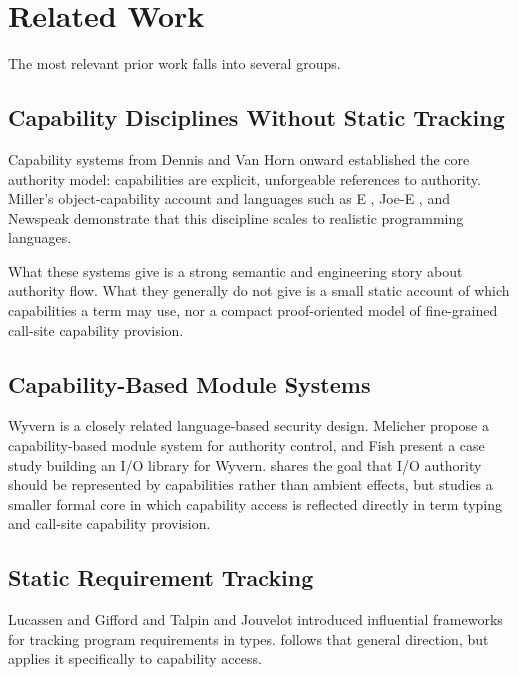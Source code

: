 
\section{Related Work}
\label{sec:related}

The most relevant prior work falls into several groups. %

\subsection{Capability Disciplines Without Static Tracking}

Capability systems from Dennis and Van Horn onward \cite{dennis-vanhorn}
established the core authority model: capabilities are explicit,
unforgeable references to authority. %
Miller's object-capability account
\cite{miller-robust,miller-paradigm} and languages such as E \cite{e-lang},
Joe-E \cite{joe-e}, and Newspeak \cite{newspeak} demonstrate that this
discipline scales to realistic programming languages. %

What these systems give is a strong semantic and engineering story about
authority flow. %
What they generally do not give is a small static account of
which capabilities a term may use, nor a compact proof-oriented model of
fine-grained call-site capability provision. %

\subsection{Capability-Based Module Systems}

Wyvern is a closely related language-based security design. %
Melicher \etal{} \cite{melicher-wyvern} propose a capability-based module
system for authority control, and Fish \etal{} \cite{fish-wyvern-io} present
a case study building an I/O library for Wyvern. %
\lambdaCap{} shares the goal that I/O authority should be represented by
capabilities rather than ambient effects, but studies a smaller formal core in
which capability access is reflected directly in term typing and call-site
capability provision. %

\subsection{Static Requirement Tracking}

Lucassen and Gifford \cite{lucassen-gifford} and Talpin and Jouvelot
\cite{talpin-jouvelot} introduced influential frameworks for tracking
program requirements in types. %
 \lambdaCap{} follows that general direction,
but applies it specifically to capability access. %

